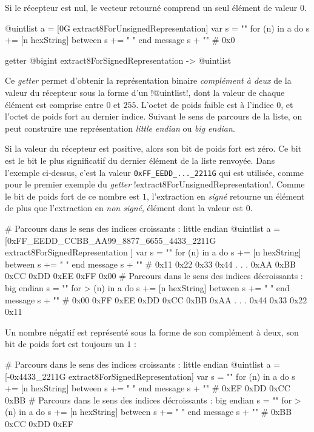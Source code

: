 Si le récepteur est nul, le vecteur retourné comprend un seul élément de valeur $0$.

\begin{galgas}
@uintlist a = [0G extract8ForUnsignedRepresentation]
var s = ""
for (n) in a
  do s += [n hexString]
  between s += " "
end
message s + "\n" # 0x0
\end{galgas}


\begin{galgas}
getter @bigint extract8ForSignedRepresentation -> @uintlist
\end{galgas}

Ce \emph{getter} permet d'obtenir la représentation binaire \emph{complément à deux} de la valeur du récepteur sous la forme d'un \ggs!@uintlist!, dont la valeur de chaque élément est comprise entre $0$ et $255$. L'octet de poids faible est à l'indice $0$, et l'octet de poids fort au dernier indice. Suivant le sens de parcours de la liste, on peut construire une représentation \emph{little endian} ou \emph{big endian}.

Si la valeur du récepteur est positive, alors son bit de poids fort est zéro. Ce bit est le bit le plus significatif du dernier élément de la liste renvoyée. Dans l'exemple ci-dessus, c'est la valeur \texttt{0xFF\_EEDD\_...\_2211G} qui est utilisée, comme pour le premier exemple du \emph{getter} \ggs!extract8ForUnsignedRepresentation!. Comme le bit de poids fort de ce nombre est $1$, l'extraction en \emph{signé} retourne un élément de plus que l'extraction en \emph{non signé}, élément dont la valeur est $0$.

\begin{galgas}
# Parcours dans le sens des indices croissants : little endian
@uintlist a = [0xFF_EEDD_CCBB_AA99_8877_6655_4433_2211G
  extract8ForSignedRepresentation
]
var s = ""
for (n) in a
  do s += [n hexString]
  between s += " "
end
message s + "\n" # 0x11 0x22 0x33 0x44 . . . 0xAA 0xBB 0xCC 0xDD 0xEE 0xFF 0x00
# Parcours dans le sens des indices décroissants : big endian
s = ""
for > (n) in a
  do s += [n hexString]
  between s += " "
end
message s + "\n" # 0x00 0xFF 0xEE 0xDD 0xCC 0xBB 0xAA . . . 0x44 0x33 0x22 0x11
\end{galgas}

Un nombre négatif est représenté sous la forme de son complément à deux, son bit de poids fort est toujours un $1$ : 

\begin{galgas}
# Parcours dans le sens des indices croissants : little endian
@uintlist a = [-0x4433_2211G extract8ForSignedRepresentation]
var s = ""
for (n) in a
  do s += [n hexString]
  between s += " "
end
message s + "\n" # 0xEF 0xDD 0xCC 0xBB
# Parcours dans le sens des indices décroissants : big endian
s = ""
for > (n) in a
  do s += [n hexString]
  between s += " "
end
message s + "\n" # 0xBB 0xCC 0xDD 0xEF
\end{galgas}


